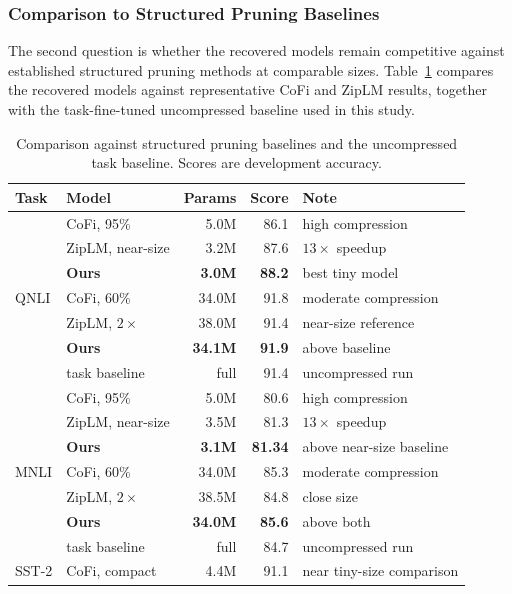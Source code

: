 \subsubsection{Comparison to Structured Pruning Baselines}

The second question is whether the recovered models remain competitive against established structured pruning methods at comparable sizes. Table~\ref{tab:literature_comparison} compares the recovered models against representative CoFi and ZipLM results, together with the task-fine-tuned uncompressed baseline used in this study.

\begin{table}[H]
\centering
\scriptsize
\setlength{\tabcolsep}{4pt}
\renewcommand{\arraystretch}{1.08}
\caption{Comparison against structured pruning baselines and the uncompressed task baseline. Scores are development accuracy.}
\label{tab:literature_comparison}
\begin{tabular}{llrrl}
\toprule
Task & Model & Params & Score & Note \\
\midrule
\multirow{7}{*}{QNLI}
& CoFi, 95\% & 5.0M  & 86.1  & high compression \\
& ZipLM, near-size & 3.2M  & 87.6  & $13\times$ speedup \\
& \textbf{Ours} & \textbf{3.0M}  & \textbf{88.2}  & best tiny model \\
& CoFi, 60\% & 34.0M & 91.8  & moderate compression \\
& ZipLM, $2\times$ & 38.0M & 91.4  & near-size reference \\
& \textbf{Ours} & \textbf{34.1M} & \textbf{91.9}  & above baseline \\
& task baseline & full  & 91.4  & uncompressed run \\
\midrule
\multirow{7}{*}{MNLI}
& CoFi, 95\% & 5.0M  & 80.6  & high compression \\
& ZipLM, near-size & 3.5M  & 81.3  & $13\times$ speedup \\
& \textbf{Ours} & \textbf{3.1M}  & \textbf{81.34}  & above near-size baseline \\
& CoFi, 60\% & 34.0M & 85.3  & moderate compression \\
& ZipLM, $2\times$ & 38.5M & 84.8  & close size \\
& \textbf{Ours} & \textbf{34.0M} & \textbf{85.6}  & above both \\
& task baseline & full  & 84.7  & uncompressed run \\
\midrule
\multirow{15}{*}{SST-2}
& CoFi, compact & 4.4M  & 91.1  & near tiny-size comparison \\

\end{tabular}
\end{table}

